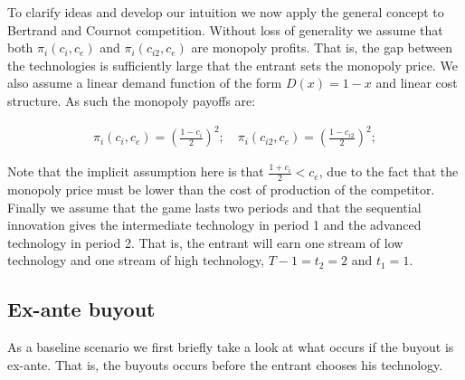 To clarify ideas and develop our intuition we now apply the general concept to Bertrand and Cournot competition. Without loss of generality we assume that both $\pi_i(c_i,c_e)$ and
$\pi_i(c_{i2},c_e)$ are monopoly profits. That is, the gap between the technologies is sufficiently large that the entrant sets the monopoly price. We also assume a linear demand function of the form $D(x)=1-x$ and linear cost structure.  As such the monopoly payoffs are: 

\begin{align*}
\pi_i(c_i,c_e) = 
\left(\frac{1-c_i}{2}\right)^2; \quad \pi_i(c_{i2},c_e) = \left(\frac{1-c_{i2}}{2}\right)^2;  
\end{align*}

Note that the implicit assumption here is that $\frac{1+c_i}{2}<c_e$, due to the fact that the monopoly price must be lower than the cost of production of the competitor. Finally we assume that the game lasts two periods and that the sequential innovation gives the intermediate technology in period 1 and the advanced technology in period 2. That is, the entrant will earn one stream of low technology and one stream of high technology, $T-1=t_2=2$ and $t_1=1$.

\subsection{Ex-ante buyout}

As a baseline scenario we first briefly take a look at what occurs if the buyout is ex-ante. That is, the buyouts occurs before the entrant chooses his technology. 


